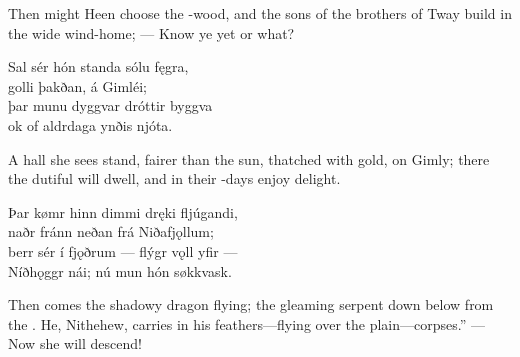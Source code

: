 \bvb Then might Heen choose the -wood, and the sons of the brothers of Tway build in the wide wind-home\footnotemark[1]; — Know ye yet or what?\evb
{}

\bva Sal sér hón standa \hld sólu fęgra, \\%
golli þakðan, \hld á Gimléi; \\%
þar munu dyggvar \hld dróttir byggva \\%
ok of aldrdaga \hld ynðis njóta.\eva

\bvb A hall she sees stand, fairer than the sun, thatched with gold, on Gimly; there the dutiful  will dwell, and in their -days enjoy delight.\evb

\bva Þar kømr hinn dimmi \hld dręki fljúgandi, \\%
naðr fránn neðan \hld frá Niðafjǫllum; \\%
berr sér í fjǫðrum \hld — flýgr vǫll yfir — \\%
Níðhǫggr nái; \hld nú mun hón søkkvask.\eva

\bvb Then comes the shadowy dragon flying; the gleaming serpent down below from the . He, Nithehew, carries in his feathers—flying over the plain—corpses.” — Now she will descend!\footnotemark[1]\evb
{}
